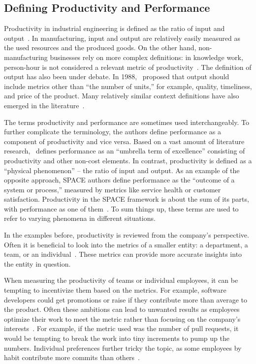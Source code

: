 \subsection{Defining Productivity and Performance}
Productivity in industrial engineering is defined as the ratio of input and output~\cite{syverson_what_2011, chew_no-nonsense_1988}. In manufacturing, input and output are relatively easily measured as the used resources and the produced goods. On the other hand, non-manufacturing businesses rely on more complex definitions: in knowledge work, person-hour is not considered a relevant metric of productivity~\cite{tangen_demystifying_2005}. The definition of output has also been under debate. In 1988, \citet{chew_no-nonsense_1988}~proposed that output should include metrics other than ``the number of units,'' for example, quality, timeliness, and price of the product. Many relatively similar context definitions have also emerged in the literature~\cite{tangen_demystifying_2005}.

The terms productivity and performance are sometimes used interchangeably. To further complicate the terminology, the authors define performance as a component of productivity and vice versa. Based on a vast amount of literature research, \citet{tangen_demystifying_2005}~defines performance as an ``umbrella term of excellence'' consisting of productivity and other non-cost elements. In contrast, productivity is defined as a ``physical phenomenon'' – the ratio of input and output. As an example of the opposite approach, SPACE authors define performance as the ``outcome of a system or process,'' measured by metrics like service health or customer satisfaction. Productivity in the SPACE framework is about the sum of its parts, with performance as one of them~\cite{forsgren_space_2021}. To sum things up, these terms are used to refer to varying phenomena in different situations.

In the examples before, productivity is reviewed from the company's perspective. Often it is beneficial to look into the metrics of a smaller entity: a department, a team, or an individual~\cite{forsgren_space_2021, tangen_demystifying_2005}. These metrics can provide more accurate insights into the entity in question.

When measuring the productivity of teams or individual employees, it can be tempting to incentivize them based on the metrics. For example, software developers could get promotions or raise if they contribute more than average to the product. Often these ambitions can lead to unwanted results as employees optimize their work to meet the metric rather than focusing on the company's interests~\cite{symons_software_2010, chew_no-nonsense_1988}. For example, if the metric used was the number of pull requests, it would be tempting to break the work into tiny increments to pump up the numbers. Individual preferences further tricky the topic, as some employees by habit contribute more commits than others~\cite{oliveira_code_2020}. 


